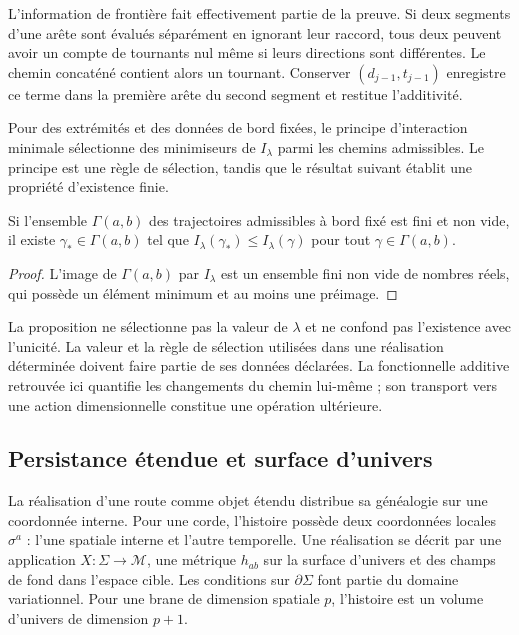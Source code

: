 L’information de frontière fait effectivement partie de la preuve.
Si deux segments d’une arête sont évalués séparément
en ignorant leur raccord, tous deux peuvent avoir un compte
de tournants nul même si leurs directions sont différentes. Le
chemin concaténé contient alors un tournant. Conserver
\((d_{j-1},t_{j-1})\) enregistre ce terme dans la première
arête du second segment et restitue l’additivité.

Pour des extrémités et des données de bord fixées, le principe
d’interaction minimale sélectionne des minimiseurs de
\(I_\lambda\) parmi les chemins admissibles. Le principe
est une règle de sélection, tandis que le résultat
suivant établit une propriété d’existence finie.

\begin{proposition}
Si l’ensemble \(\Gamma(a,b)\) des trajectoires admissibles
à bord fixé est fini et non vide, il existe
\(\gamma_*\in\Gamma(a,b)\) tel que
\(I_\lambda(\gamma_*)\leq I_\lambda(\gamma)\)
pour tout \(\gamma\in\Gamma(a,b)\).
\end{proposition}
\begin{proof}
L’image de \(\Gamma(a,b)\) par \(I_\lambda\) est
un ensemble fini non vide de nombres réels, qui possède
un élément minimum et au moins une préimage.
\end{proof}

La proposition ne sélectionne pas la valeur de \(\lambda\)
et ne confond pas l’existence avec l’unicité. La valeur et la règle
de sélection utilisées dans une réalisation déterminée
doivent faire partie de ses données déclarées. La fonctionnelle
additive retrouvée ici quantifie les changements du chemin
lui-même ; son transport vers une action dimensionnelle constitue
une opération ultérieure.

\subsection{Persistance étendue et surface d’univers}

La réalisation d’une route comme objet étendu distribue
sa généalogie sur une coordonnée interne. Pour une corde,
l’histoire possède deux coordonnées locales \(\sigma^a\) :
l’une spatiale interne et l’autre temporelle. Une réalisation se
décrit par une application \(X:\Sigma\to\mathcal M\), une
métrique \(h_{ab}\) sur la surface d’univers et des champs
de fond dans l’espace cible. Les conditions sur
\(\partial\Sigma\) font partie du domaine variationnel.
Pour une brane de dimension spatiale \(p\), l’histoire
est un volume d’univers de dimension \(p+1\).

